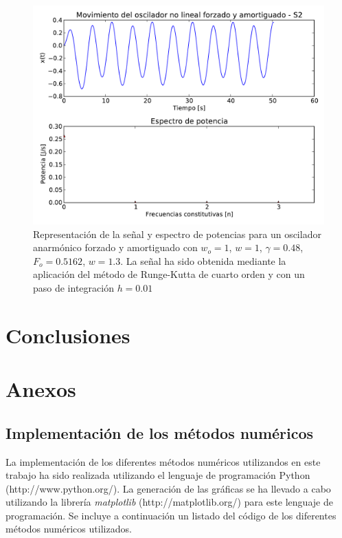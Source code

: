 \documentclass[11pt]{article}
\begin{document}
\begin{figure}
\centering
\includegraphics[width=0.75\linewidth]{caso_anarmonico_s2.pdf}
\caption{Representación de la señal y espectro de potencias para un oscilador anarmónico forzado y amortiguado con $w_o = 1$, $w = 1$, $\gamma = 0.48$, $F_o = 0.5162$, $w = 1.3$. La señal ha sido obtenida mediante la aplicación del método de Runge-Kutta de cuarto orden y con un paso de integración $h = 0.01$}
\label{fig:caso_anarmonico_s2}
\end{figure}

\section{Conclusiones}

\section{Anexos}

\subsection{Implementación de los métodos numéricos}
La implementación de los diferentes métodos numéricos utilizandos en este trabajo ha sido realizada utilizando el lenguaje de programación Python (http://www.python.org/). La generación de las gráficas se ha llevado a cabo utilizando la librería \textit{matplotlib} (http://matplotlib.org/) para este lenguaje de programación. Se incluye a continuación un listado del código de los diferentes métodos numéricos utilizados.
\end{document}
